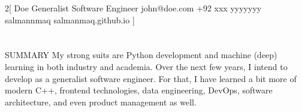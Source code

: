 \documentclass{my_cv}
\begin{document}
\begin{multicols}{2}[
        {Doe}%
        {Generalist Software Engineer}%
        {john@doe.com}%
        {+92 xxx yyyyyyy}%
        {salmannmaq}%
        {salmanmaq.github.io}%
]
\end{multicols}

\section{\faFileText}{SUMMARY}
My strong suits are Python development and machine (deep) learning in both industry and academia. Over the next few years, I intend to develop as a generalist software engineer. For that, I have learned a bit more of modern C++, frontend technologies, data engineering, DevOps, software architecture, and even product management as well.
\end{document}

